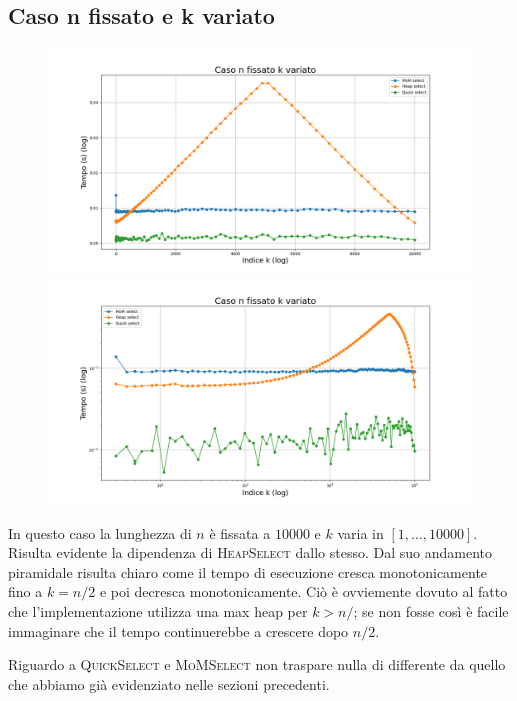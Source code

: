 \documentclass[a4paper]{article}
\newcommand{\QuickSelect}{\textsc{QuickSelect}}
\newcommand{\HeapSelect}{\textsc{HeapSelect}}
\newcommand{\MoMSelect}{\textsc{MoMSelect}}
\begin{document}
\newpage
\subsection{Caso n fissato e k variato}
\begin{figure}[h]
    \centering
    \includegraphics[width=.83\textwidth]{graphs/n_fixed_n.png}
    \includegraphics[width=.83\textwidth]{graphs/n_fixed_2xlog.png}
\end{figure}

In questo caso la lunghezza di $n$ è fissata a $10000$ e $k$ varia in $[1,\dots,10000]$.
Risulta evidente la dipendenza di \HeapSelect{} dallo stesso.
Dal suo andamento piramidale risulta chiaro come il tempo di esecuzione cresca monotonicamente fino a $k=n/2$ e poi decresca monotonicamente.
Ciò è ovviemente dovuto al fatto che l'implementazione utilizza una max heap per $k>n/$; se non fosse così è facile immaginare che il tempo continuerebbe a crescere dopo $n/2$.

Riguardo a \QuickSelect{} e \MoMSelect{} non traspare nulla di differente da quello che abbiamo già evidenziato nelle sezioni precedenti.

\newpage
\end{document}
